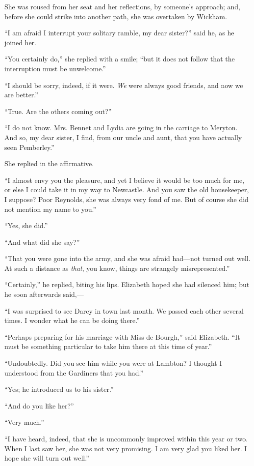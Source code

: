 \documentclass[12pt,openright]{book}
\begin{document}
She was roused from her seat and her reflections, by someone’s approach; and, before she could strike into another path, she was overtaken by Wickham.

“I am afraid I interrupt your solitary ramble, my dear sister?” said he, as he joined her.

“You certainly do,” she replied with a smile; “but it does not follow that the interruption must be unwelcome.”

“I should be sorry, indeed, if it were. \textit{We} were always good friends, and now we are better.”

“True. Are the others coming out?”

“I do not know. Mrs. Bennet and Lydia are going in the carriage to Meryton. And so, my dear sister, I find, from our uncle and aunt, that you have actually seen Pemberley.”

She replied in the affirmative.

“I almost envy you the pleasure, and yet I believe it would be too much for me, or else I could take it in my way to Newcastle. And you saw the old housekeeper, I suppose? Poor Reynolds, she was always very fond of me. But of course she did not mention my name to you.”

“Yes, she did.”

“And what did she say?”

“That you were gone into the army, and she was afraid had—not turned out well. At such a distance as \textit{that}, you know, things are strangely misrepresented.”

“Certainly,” he replied, biting his lips. Elizabeth hoped she had silenced him; but he soon afterwards said,—

“I was surprised to see Darcy in town last month. We passed each other several times. I wonder what he can be doing there.”

“Perhaps preparing for his marriage with Miss de Bourgh,” said Elizabeth. “It must be something particular to take him there at this time of year.”

“Undoubtedly. Did you see him while you were at Lambton? I thought I understood from the Gardiners that you had.”

“Yes; he introduced us to his sister.”

“And do you like her?”

“Very much.”

“I have heard, indeed, that she is uncommonly improved within this year or two. When I last saw her, she was not very promising. I am very glad you liked her. I hope she will turn out well.”
\end{document}
